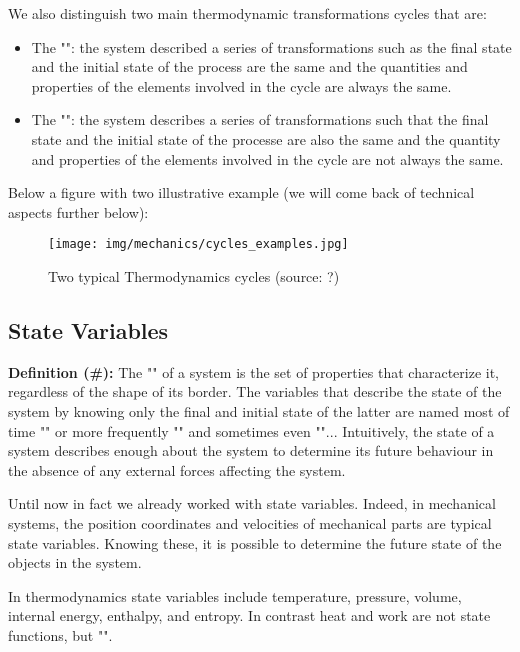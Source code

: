 	We also distinguish two main thermodynamic transformations cycles that are:
	\begin{itemize}
		\item The "": the system described a series of transformations such as the final state and the initial state of the process are the same and the quantities and properties of the elements involved in the cycle are always the same.

		\item The "": the system describes a series of transformations such that the final state and the initial state of the processe are also the same and the quantity and properties of the elements involved in the cycle are not always the same.
	\end{itemize}
	Below a figure with two illustrative example (we will come back of technical aspects further below):
	\begin{figure}[H]
		\centering
		\texttt{[image: img/mechanics/cycles\_examples.jpg]}
		\caption{Two typical Thermodynamics cycles (source: ?)}
	\end{figure}
	
	\subsection{State Variables}
	\textbf{Definition (\#\mydef):} The "" of a system is the set of properties that characterize it, regardless of the shape of its border. The variables that describe the state of the system by knowing only the final and initial state of the latter are named most of time "" or more frequently "" and sometimes even ""...  Intuitively, the state of a system describes enough about the system to determine its future behaviour in the absence of any external forces affecting the system.
	
	Until now in fact we already worked with state variables. Indeed, in mechanical systems, the position coordinates and velocities of mechanical parts are typical state variables. Knowing these, it is possible to determine the future state of the objects in the system.

	In thermodynamics state variables include temperature, pressure, volume, internal energy, enthalpy, and entropy. In contrast heat and work are not state functions, but "".


